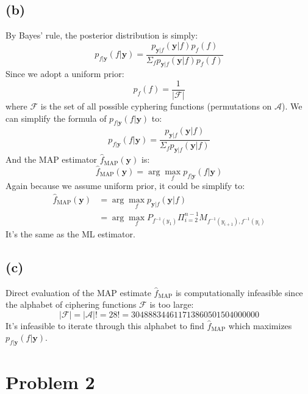 \documentclass[12pt,aps,pre,reprint]{revtex4-1}
\begin{document}
\subsection{(b)}
By Bayes' rule, the posterior distribution is simply:
\begin{equation}
	p_{f|\mathbf{y}}(f|\mathbf{y}) = \frac{p_{\mathbf{y}|f}(\mathbf{y}|f)p_{f}(f)}{\Sigma_{f}p_{\mathbf{y}|f}(\mathbf{y}|f)p_{f}(f)}
\end{equation}
Since we adopt a uniform prior:
\begin{equation}
	p_{f}(f) = \frac{1}{|\mathcal{F}|}
\end{equation}
where $\mathcal{F}$ is the set of all possible cyphering functions (permutations on $\mathcal{A}$). We can simplify the formula of $p_{f|\mathbf{y}}(f|\mathbf{y})$ to:
\begin{equation}
p_{f|\mathbf{y}}(f|\mathbf{y}) = \frac{p_{\mathbf{y}|f}(\mathbf{y}|f)}{\Sigma_{f}p_{\mathbf{y}|f}(\mathbf{y}|f)}
\end{equation}
And the MAP estimator $\hat{f}_{\text{MAP}}(\mathbf{y})$ is:
\begin{equation}
	\hat{f}_{\text{MAP}}(\mathbf{y}) = \arg\max_{f}p_{f|\mathbf{y}}(f|\mathbf{y})
\end{equation}
Again because we assume uniform prior, it could be simplify to:
\begin{equation}
\begin{split}
	\hat{f}_{\text{MAP}}(\mathbf{y}) & = \arg\max_{f}p_{\mathbf{y}|f}(\mathbf{y}|f) \\ & = \arg\max_{f}P_{f^{-1}(y_1)}\Pi_{i=2}^{n-1}M_{f^{-1}(y_{i+1}),f^{-1}(y_i)}
\end{split}
\end{equation}
It's the same as the ML estimator.

\subsection{(c)}
Direct evaluation of the MAP estimate $\hat{f}_{\text{MAP}}$ is computationally infeasible since the alphabet of ciphering functions $\mathcal{F}$ is too large:
\begin{equation}
	|\mathcal{F}| = |\mathcal{A}|! = 28! = 304888344611713860501504000000
\end{equation}
It's infeasible to iterate through this alphabet to find $\hat{f}_{\text{MAP}}$ which maximizes $p_{f|\mathbf{y}}(f|\mathbf{y})$.


\section{Problem 2}
\end{document}
